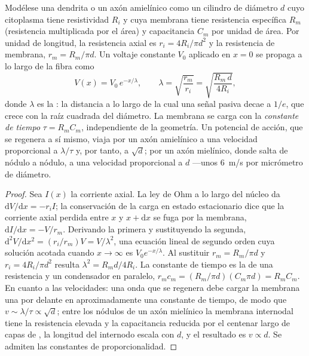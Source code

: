 \begin{theorem}\label{thm:b3:nervous-systems:cable}
Modélese una dendrita o un axón amielínico como un cilindro de diámetro
$d$ cuyo citoplasma tiene resistividad $R_{i}$ y cuya membrana tiene
resistencia específica $R_{m}$ (resistencia multiplicada por el área) y
capacitancia $C_{m}$ por unidad de área. Por unidad de longitud, la
resistencia axial es $r_{i} = 4R_{i}/\pi d^{2}$ y la resistencia de
membrana, $r_{m} = R_{m}/\pi d$. Un voltaje constante $V_{0}$ aplicado
en $x = 0$ se propaga a lo largo de la fibra como
\[
V(x) = V_{0}\,e^{-x/\lambda}, \qquad
\lambda = \sqrt{\frac{r_{m}}{r_{i}}} = \sqrt{\frac{R_{m}\,d}{4R_{i}}},
\]
donde $\lambda$ es la \emph{}: la distancia a lo
largo de la cual una señal pasiva decae a $1/e$, que crece con la raíz
cuadrada del diámetro. La membrana se carga con la \emph{constante de
tiempo} $\tau =
R_{m}C_{m}$, independiente de la geometría. Un potencial de acción, que
se regenera a sí mismo, viaja por un axón amielínico a una velocidad
proporcional a $\lambda/\tau$ y, por tanto, a $\sqrt{d}$; por un axón
mielínico, donde salta de nódulo a nódulo, a una velocidad proporcional
a $d$ ---unos \qty{6}{m/s} por micrómetro de diámetro.
\end{theorem}
\begin{proof}
Sea $I(x)$ la corriente axial. La ley de Ohm a lo largo del núcleo da
$\mathrm{d}V/\mathrm{d}x = -r_{i}I$; la conservación de la carga en
estado estacionario dice que la corriente axial perdida entre $x$ y $x + \mathrm{d}x$
se fuga por la membrana, $\mathrm{d}I/\mathrm{d}x = -V/r_{m}$.
Derivando la primera y sustituyendo la segunda,
$\mathrm{d}^{2}V/\mathrm{d}x^{2} = (r_{i}/r_{m})V = V/\lambda^{2}$, una
ecuación lineal de segundo orden cuya solución acotada cuando $x \to \infty$ es
$V_{0}e^{-x/\lambda}$. Al sustituir $r_{m} = R_{m}/\pi d$ y $r_{i} =
4R_{i}/\pi d^{2}$ resulta $\lambda^{2} = R_{m}d/4R_{i}$. La constante
de tiempo es la de una resistencia y un condensador en paralelo, $r_{m}c_{m} =
(R_{m}/\pi d)(C_{m}\pi d) = R_{m}C_{m}$. En cuanto a las velocidades:
una onda que se regenera debe cargar la membrana una  por delante en aproximadamente una constante de tiempo, de
modo que $v \sim \lambda/\tau \propto \sqrt{d}$; entre los nódulos de
un axón mielínico la membrana internodal tiene la resistencia elevada y
la capacitancia reducida por el centenar largo de capas de , la
longitud del internodo escala con $d$, y el resultado es
$v \propto d$. Se admiten las constantes de proporcionalidad.
\end{proof}

